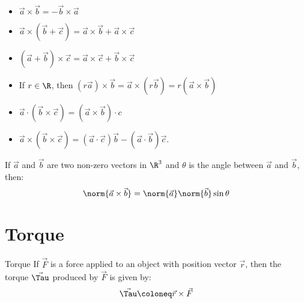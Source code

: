 \documentclass[12pt]{report}
\begin{document}
\begin{itemize}
    \item $\vec{a} \times \vec{b} = -\vec{b} \times \vec{a}$
    \item $\vec{a} \times (\vec{b} + \vec{c}) = \vec{a} \times \vec{b} + \vec{a} \times \vec{c}$
    \item $(\vec{a} + \vec{b}) \times \vec{c} = \vec{a} \times \vec{c} + \vec{b} \times \vec{c}$
    \item If $r \in \R$, then $(r\vec{a}) \times \vec{b} = \vec{a} \times (r\vec{b}) = r(\vec{a} \times \vec{b})$
    \item $\vec{a} \cdot (\vec{b} \times \vec{c}) = (\vec{a} \times \vec{b}) \cdot c$
    \item $\vec{a} \times (\vec{b} \times \vec{c}) = (\vec{a} \cdot \vec{c}) \vec{b} - (\vec{a} \cdot \vec{b}) \vec{c}$.
\end{itemize}

\begin{thmbox}{}{}
    If $\vec{a}$ and $\vec{b}$ are two non-zero vectors in $\R^3$ and $\theta$ is the angle between $\vec{a}$ and $\vec{b}$, then:
    \[ \norm{\vec{a} \times \vec{b}} = \norm{\vec{a}} \norm{\vec{b}} \sin{\theta} \]
\end{thmbox}

\section{Torque}

\begin{dfnbox}{Torque}{}
    If $\vec{F}$ is a force applied to an object with position vector $\vec{r}$, then the torque $\vec{\Tau}$ produced by $\vec{F}$ is given by:
    \[ \vec{\Tau} \coloneq \vec{r} \times \vec{F} \]
\end{dfnbox}



\makeamzindex
\end{document}
